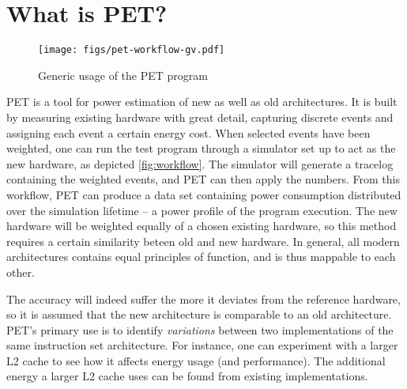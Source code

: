 \section{What is PET?}
\label{sec:whatispet}
\begin{figure}
    \texttt{[image: figs/pet-workflow-gv.pdf]}
    \caption{Generic usage of the PET program}
    \label{fig:workflow}
\end{figure}

PET is a tool for power estimation of new as well as old architectures. It is
built by measuring existing hardware with great detail, capturing discrete events
and assigning each event a certain energy cost. When selected events have been
weighted, one can run the test program through a simulator set up to act as the
new hardware, as depicted \autoref{fig:workflow}. The simulator will generate a
tracelog containing the weighted events, and PET can then apply the numbers.
From this workflow, PET can produce a data set containing power consumption
distributed over the simulation lifetime -- a power profile of the program
execution. The new hardware will be weighted equally of a chosen existing
hardware, so this method requires a certain similarity beteen old and new
hardware. In general, all modern architectures contains equal principles
of function, and is thus mappable to each other.

The accuracy will indeed suffer the more it deviates from the reference
hardware, so it is assumed that the new architecture is comparable to an old
architecture. PET's primary use is to identify \emph{variations} between two
implementations of the same instruction set architecture. For instance, one can
experiment with a larger L2 cache to see how it affects energy usage (and
performance). The additional energy a larger L2 cache uses can be found from
existing implementations.

